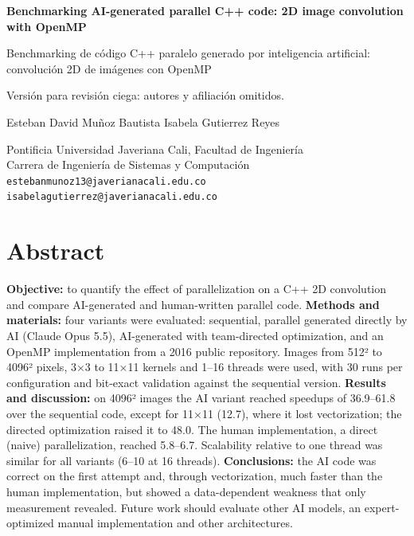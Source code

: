 \documentclass[12pt]{article}
\begin{document}
\sloppy
\begin{flushright}
{\LARGE\bfseries Benchmarking AI-generated parallel C++ code: 2D image convolution with OpenMP\par}
\vspace{10pt}
{\Large Benchmarking de código C++ paralelo generado por inteligencia artificial: convolución 2D de imágenes con OpenMP\par}
\end{flushright}
\vspace{14pt}
\ifdefined\versionciega
\begin{center}
{\large Versión para revisión ciega: autores y afiliación omitidos.\par}
\end{center}
\else
\begin{center}
{\large Esteban David Muñoz Bautista \quad Isabela Gutierrez Reyes\par}
\vspace{6pt}
Pontificia Universidad Javeriana Cali, Facultad de Ingeniería\\
Carrera de Ingeniería de Sistemas y Computación\\
\texttt{estebanmunoz13@javerianacali.edu.co}\\
\texttt{isabelagutierrez@javerianacali.edu.co}
\end{center}
\fi

\section*{Abstract}
\textbf{Objective:} to quantify the effect of parallelization on a C++ 2D convolution and compare AI-generated and human-written parallel code.
\textbf{Methods and materials:} four variants were evaluated: sequential, parallel generated directly by AI (Claude Opus 5.5), AI-generated with team-directed optimization, and an OpenMP implementation from a 2016 public repository. Images from 512² to 4096² pixels, 3×3 to 11×11 kernels and 1--16 threads were used, with 30 runs per configuration and bit-exact validation against the sequential version.
\textbf{Results and discussion:} on 4096² images the AI variant reached speedups of 36.9--61.8 over the sequential code, except for 11×11 (12.7), where it lost vectorization; the directed optimization raised it to 48.0. The human implementation, a direct (naive) parallelization, reached 5.8--6.7. Scalability relative to one thread was similar for all variants (6--10 at 16 threads).
\textbf{Conclusions:} the AI code was correct on the first attempt and, through vectorization, much faster than the human implementation, but showed a data-dependent weakness that only measurement revealed. Future work should evaluate other AI models, an expert-optimized manual implementation and other architectures.
\end{document}
